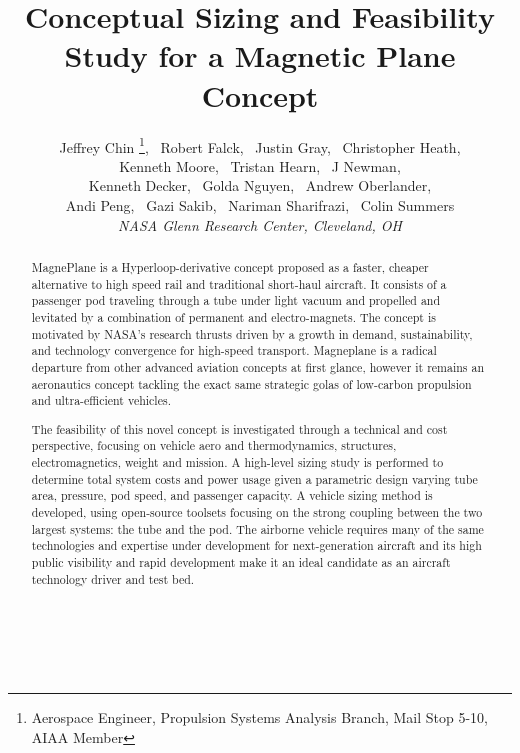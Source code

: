 \documentclass[]             %
{aiaa-tc}                       %
\title{Conceptual Sizing and Feasibility Study for a Magnetic Plane Concept}
\author{
  Jeffrey Chin%
     \footnote{Aerospace Engineer, Propulsion Systems Analysis Branch, Mail Stop 5-10, AIAA Member},
  \ Robert Falck\footnotemark[\value{footnote}] ,%
  \ Justin Gray\footnotemark[\value{footnote}] ,%
  \ Christopher Heath\footnotemark[\value{footnote}] ,%
  \\ Kenneth Moore\footnotemark[\value{footnote}] ,%
  \ Tristan Hearn\footnotemark[\value{footnote}] ,%
  \ J Newman\footnotemark[\value{footnote}],%
  \\ Kenneth Decker\footnotemark[\value{footnote}],%
  \ Golda Nguyen\footnotemark[\value{footnote}],%
  \ Andrew Oberlander\footnotemark[\value{footnote}],%
  \\ Andi Peng\footnotemark[\value{footnote}],%
  \ Gazi Sakib\footnotemark[\value{footnote}],%
  \ Nariman Sharifrazi\footnotemark[\value{footnote}],%
  \ Colin Summers\footnotemark[\value{footnote}]%
  \\
  {\normalsize\itshape
  NASA Glenn Research Center, Cleveland, OH}
}
\begin{document}
\maketitle

\begin{abstract}
MagnePlane is a Hyperloop-derivative concept proposed as a faster,
cheaper alternative to high speed rail and traditional short-haul aircraft.
It consists of a passenger pod traveling through a tube under light vacuum and
propelled and levitated by a combination of permanent and electro-magnets.
The concept is motivated by NASA's research thrusts driven by a growth in
demand, sustainability, and technology convergence for high-speed transport.
Magneplane is a radical departure from other advanced aviation concepts at
first glance, however it remains an aeronautics concept tackling the exact
same strategic golas of low-carbon propulsion and ultra-efficient vehicles.

The feasibility of this novel concept is investigated through a technical
and cost perspective, focusing on vehicle aero and thermodynamics, structures,
electromagnetics, weight and mission.
A high-level sizing study is performed to determine total system costs and
power usage given a parametric design varying tube area,
pressure, pod speed, and passenger capacity.
A vehicle sizing method is developed, using open-source toolsets focusing on
the strong coupling between the two largest systems: the tube and the pod.
The airborne vehicle requires many of the same technologies and expertise
under development for next-generation aircraft and its high public visibility
and rapid development make it an ideal candidate as an aircraft
technology driver and test bed.
\\
\\
\\
\\

\end{abstract}

\setcounter{secnumdepth}{1}
\setcounter{tocdepth}{1}
\printnomenclature






\end{document}
